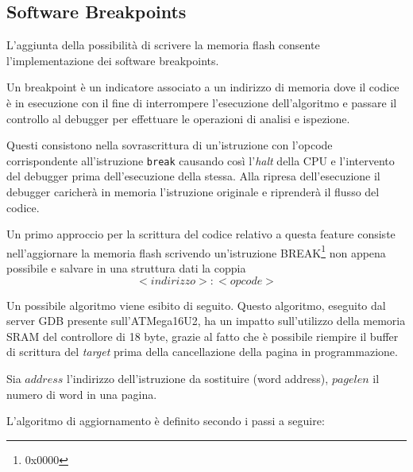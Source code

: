\subsection{Software Breakpoints}

L'aggiunta della possibilità di scrivere la memoria flash consente l'implementazione dei software breakpoints.

Un breakpoint è un indicatore associato a un indirizzo di memoria dove il codice è in esecuzione con il fine di interrompere l'esecuzione dell'algoritmo e passare il controllo al debugger per effettuare le operazioni di analisi e ispezione.

Questi consistono nella sovrascrittura di un'istruzione con l'opcode corrispondente all'istruzione \texttt{break} causando così l'\textit{halt} della CPU e l'intervento del debugger prima dell'esecuzione della stessa.
Alla ripresa dell'esecuzione il debugger caricherà in memoria l'istruzione originale e riprenderà il flusso del codice.

Un primo approccio per la scrittura del codice relativo a questa feature consiste nell'aggiornare la memoria flash scrivendo un'istruzione BREAK\footnote{0x0000} non appena possibile e salvare in una struttura dati la coppia \[<indirizzo>:<opcode>\]

Un possibile algoritmo viene esibito di seguito. Questo algoritmo, eseguito dal server GDB presente sull'ATMega16U2, ha un impatto sull'utilizzo della memoria SRAM del controllore di 18 byte, grazie al fatto che è possibile riempire il buffer di scrittura del \textit{target} prima della cancellazione della pagina in programmazione\cite{avr:m328p}.

Sia \(address\) l'indirizzo dell'istruzione da sostituire (word address), \(pagelen\) il numero di word in una pagina.

L'algoritmo di aggiornamento è definito secondo i passi a seguire:

